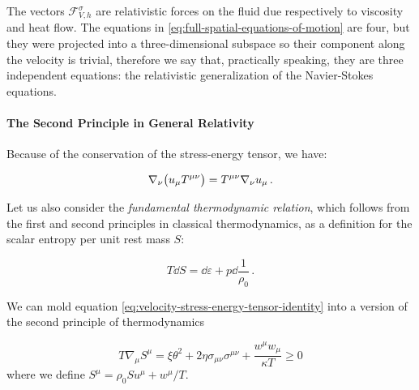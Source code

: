 \documentclass[main.tex]{subfiles}
\begin{document}
The vectors \(\mathscr F^\sigma _{V, h}\) are relativistic forces on the fluid due respectively to viscosity and heat flow.
The equations in \eqref{eq:full-spatial-equations-of-motion} are four, but they were projected into a three-dimensional subspace so their component along the velocity is trivial, therefore we say that, practically speaking, they are three independent equations: the relativistic generalization of the Navier-Stokes equations.

\paragraph{The Second Principle in General Relativity}

Because of the conservation of the stress-energy tensor, we have:

\begin{equation} \label{eq:velocity-stress-energy-tensor-identity}
    \nabla_\nu \qty(u_\mu T ^{\mu \nu}) = T^{\mu \nu} \nabla_\nu u_\mu \,.
\end{equation}

Let us also consider the \emph{fundamental thermodynamic relation}, which follows from the first and second principles in classical thermodynamics, as a definition for the scalar entropy per unit rest mass \(S\):

\begin{equation} \label{eq:differential-entropy}
    T\dd{S} = \dd{\varepsilon} + p \dd{\frac{1}{\rho_0}} \,.
\end{equation}

\begin{claim}
    We can mold equation \eqref{eq:velocity-stress-energy-tensor-identity} into a version of the second principle of thermodynamics

    \begin{equation} \label{eq:second-principle-thermodynamics}
        T \nabla_\mu S^\mu = \xi \theta^2 + 2 \eta \sigma_{\mu\nu} \sigma^{\mu\nu} + \frac{w^\mu w_\mu}{\kappa T} \geq 0
    \end{equation}
    where we define \(S^\mu = \rho_0 S u^\mu + w^\mu /T\).
\end{claim}
\end{document}
